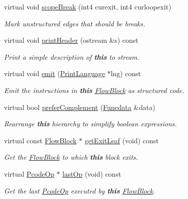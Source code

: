 \begin{DoxyCompactItemize}
virtual void \mbox{\hyperlink{class_block_if_afeafc0ad59b47dde90d4b477a2ef7637}{scope\+Break}} (int4 curexit, int4 curloopexit)
\begin{DoxyCompactList}\small\item\em Mark unstructured edges that should be {\itshape breaks}. \end{DoxyCompactList}\item 
virtual void \mbox{\hyperlink{class_block_if_a6c45f688f991ec5f1412c51e56bf5fd3}{print\+Header}} (ostream \&s) const
\begin{DoxyCompactList}\small\item\em Print a simple description of {\bfseries{this}} to stream. \end{DoxyCompactList}\item 
virtual void \mbox{\hyperlink{class_block_if_a81d526be9d8cca137f9008ac7a12d410}{emit}} (\mbox{\hyperlink{class_print_language}{Print\+Language}} $\ast$lng) const
\begin{DoxyCompactList}\small\item\em Emit the instructions in {\bfseries{this}} \mbox{\hyperlink{class_flow_block}{Flow\+Block}} as structured code. \end{DoxyCompactList}\item 
virtual bool \mbox{\hyperlink{class_block_if_a41fef7fb5278f859257b6e560c0a08dd}{prefer\+Complement}} (\mbox{\hyperlink{class_funcdata}{Funcdata}} \&data)
\begin{DoxyCompactList}\small\item\em Rearrange {\bfseries{this}} hierarchy to simplify boolean expressions. \end{DoxyCompactList}\item 
virtual const \mbox{\hyperlink{class_flow_block}{Flow\+Block}} $\ast$ \mbox{\hyperlink{class_block_if_a9adb3bd7302e374459669718f1265826}{get\+Exit\+Leaf}} (void) const
\begin{DoxyCompactList}\small\item\em Get the \mbox{\hyperlink{class_flow_block}{Flow\+Block}} to which {\bfseries{this}} block exits. \end{DoxyCompactList}\item 
virtual \mbox{\hyperlink{class_pcode_op}{Pcode\+Op}} $\ast$ \mbox{\hyperlink{class_block_if_a94053e78df44aef0ee7a225dc4f3a5a5}{last\+Op}} (void) const
\begin{DoxyCompactList}\small\item\em Get the last \mbox{\hyperlink{class_pcode_op}{Pcode\+Op}} executed by {\bfseries{this}} \mbox{\hyperlink{class_flow_block}{Flow\+Block}}. \end{DoxyCompactList}\item 

\end{DoxyCompactItemize}
